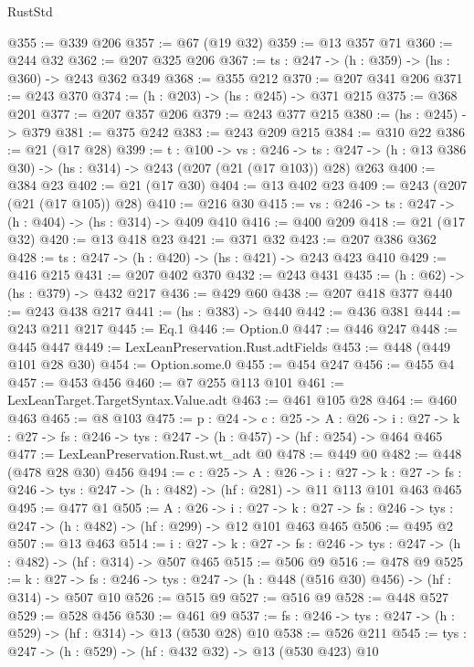 \begin{lexlean}{RustStd}
\begin{coremodule}
@355 := @339 @206
@357 := @67 (@19 @32)
@359 := @13 @357 @71
@360 := @244 @32
@362 := @207 @325 @206
@367 := {ts : @247} -> (h : @359) -> (hs : @360) -> @243 @362 @349
@368 := @355 @212
@370 := @207 @341 @206
@371 := @243 @370
@374 := (h : @203) -> (hs : @245) -> @371 @215
@375 := @368 @201
@377 := @207 @357 @206
@379 := @243 @377 @215
@380 := (hs : @245) -> @379
@381 := @375 @242
@383 := @243 @209 @215
@384 := @310 @22
@386 := @21 (@17 @28)
@399 := {t : @100} ->
  {vs : @246} ->
  {ts : @247} -> (h : @13 @386 @30) -> (hs : @314) -> @243 (@207 (@21 (@17 @103)) @28) @263
@400 := @384 @23
@402 := @21 (@17 @30)
@404 := @13 @402 @23
@409 := @243 (@207 (@21 (@17 @105)) @28)
@410 := @216 @30
@415 := {vs : @246} -> {ts : @247} -> (h : @404) -> (hs : @314) -> @409 @410
@416 := @400 @209
@418 := @21 (@17 @32)
@420 := @13 @418 @23
@421 := @371 @32
@423 := @207 @386 @362
@428 := {ts : @247} -> (h : @420) -> (hs : @421) -> @243 @423 @410
@429 := @416 @215
@431 := @207 @402 @370
@432 := @243 @431
@435 := (h : @62) -> (hs : @379) -> @432 @217
@436 := @429 @60
@438 := @207 @418 @377
@440 := @243 @438 @217
@441 := (hs : @383) -> @440
@442 := @436 @381
@444 := @243 @211 @217
@445 := Eq.{1}
@446 := Option.{0}
@447 := @446 @247
@448 := @445 @447
@449 := LexLeanPreservation.Rust.adtFields
@453 := @448 (@449 @101 @28 @30)
@454 := Option.some.{0}
@455 := @454 @247
@456 := @455 @4
@457 := @453 @456
@460 := @7 @255 @113 @101
@461 := LexLeanTarget.TargetSyntax.Value.adt
@463 := @461 @105 @28
@464 := @460 @463
@465 := @8 @103
@475 := {p : @24} ->
  {c : @25} ->
  {A : @26} ->
  {i : @27} -> {k : @27} -> {fs : @246} -> {tys : @247} -> (h : @457) -> (hf : @254) -> @464 @465
@477 := LexLeanPreservation.Rust.wt_adt @0
@478 := @449 @0
@482 := @448 (@478 @28 @30) @456
@494 := {c : @25} ->
  {A : @26} ->
  {i : @27} ->
  {k : @27} -> {fs : @246} -> {tys : @247} -> (h : @482) -> (hf : @281) -> @11 @113 @101 @463 @465
@495 := @477 @1
@505 := {A : @26} ->
  {i : @27} ->
  {k : @27} -> {fs : @246} -> {tys : @247} -> (h : @482) -> (hf : @299) -> @12 @101 @463 @465
@506 := @495 @2
@507 := @13 @463
@514 := {i : @27} ->
  {k : @27} -> {fs : @246} -> {tys : @247} -> (h : @482) -> (hf : @314) -> @507 @465
@515 := @506 @9
@516 := @478 @9
@525 := {k : @27} ->
  {fs : @246} -> {tys : @247} -> (h : @448 (@516 @30) @456) -> (hf : @314) -> @507 @10
@526 := @515 @9
@527 := @516 @9
@528 := @448 @527
@529 := @528 @456
@530 := @461 @9
@537 := {fs : @246} -> {tys : @247} -> (h : @529) -> (hf : @314) -> @13 (@530 @28) @10
@538 := @526 @211
@545 := {tys : @247} -> (h : @529) -> (hf : @432 @32) -> @13 (@530 @423) @10

\end{coremodule}
\end{lexlean}

